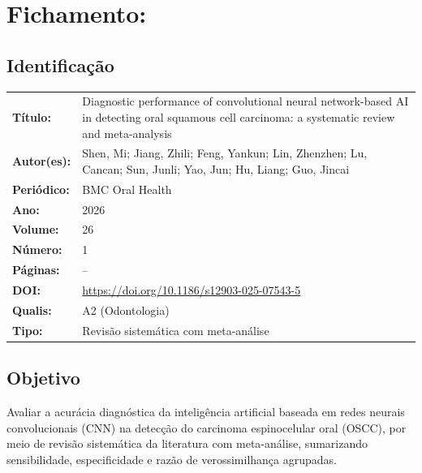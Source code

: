 \section{Fichamento: }

\subsection{Identificação}
\begin{tabular}{ll}
\textbf{Título:} & Diagnostic performance of convolutional neural network-based
AI in detecting oral squamous cell carcinoma: a systematic review and
meta-analysis \\
\textbf{Autor(es):} & Shen, Mi; Jiang, Zhili; Feng, Yankun; Lin, Zhenzhen;
Lu, Cancan; Sun, Junli; Yao, Jun; Hu, Liang; Guo, Jincai \\
\textbf{Periódico:} & BMC Oral Health \\
\textbf{Ano:} & 2026 \\
\textbf{Volume:} & 26 \\
\textbf{Número:} & 1 \\
\textbf{Páginas:} & -- \\
\textbf{DOI:} & \url{https://doi.org/10.1186/s12903-025-07543-5} \\
\textbf{Qualis:} & A2 (Odontologia) \\
\textbf{Tipo:} & Revisão sistemática com meta-análise \\
\end{tabular}

\subsection{Objetivo}
Avaliar a acurácia diagnóstica da inteligência artificial baseada em redes
neurais convolucionais (CNN) na detecção do carcinoma espinocelular oral (OSCC),
por meio de revisão sistemática da literatura com meta-análise, sumarizando
sensibilidade, especificidade e razão de verossimilhança agrupadas.

